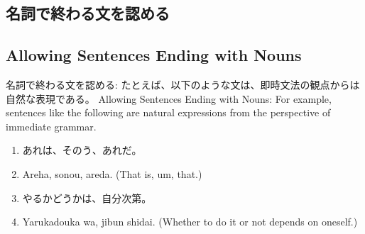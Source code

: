 \ifJPN
\subsection{名詞で終わる文を認める}
\else
  \subsection{Allowing Sentences Ending with Nouns}
\fi
\label{ex:noun-ending-sentences}

\ifJPN
名詞で終わる文を認める: たとえば、以下のような文は、即時文法の観点からは自然な表現である。
\else
Allowing Sentences Ending with Nouns: For example, sentences like the following are natural expressions from the perspective of immediate grammar.
\fi

\begin{enumerate}
\ifJPN
  \item あれは、そのう、あれだ。
\else
  \item Areha, sonou, areda. (That is, um, that.)
\fi
\ifJPN
  \item やるかどうかは、自分次第。
\else
  \item Yarukadouka wa, jibun shidai. (Whether to do it or not depends on oneself.)
\fi
\end{enumerate}



